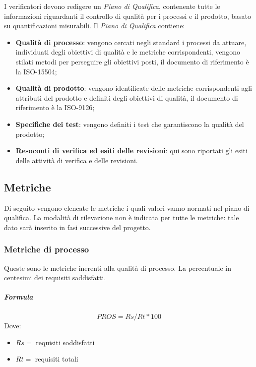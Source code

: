 			I verificatori devono redigere un \textit{Piano di Qualifica}, contenente tutte le informazioni riguardanti il controllo di qualità  per i processi e il prodotto, basato su quantificazioni misurabili. Il \textit{Piano di Qualifica} contiene:
			\begin{itemize}
			    \item \textbf{Qualità di processo}: vengono cercati negli standard i processi da attuare, individuati degli obiettivi di qualità e le metriche corrispondenti, vengono stilati metodi per perseguire gli obiettivi posti, il documento di riferimento è la ISO-15504;
			    \item \textbf{Qualità di prodotto}: vengono identificate delle metriche corrispondenti agli attributi del prodotto e definiti degli obiettivi di qualità, il documento di riferimento è la ISO-9126;
			    \item \textbf{Specifiche dei test}: vengono definiti i test che garantiscono la qualità del prodotto;
			    \item \textbf{Resoconti di verifica ed esiti delle revisioni}: qui sono riportati gli esiti delle attività di verifica e delle revisioni.
			\end{itemize}
			\subsection{Metriche}
			Di seguito vengono elencate le metriche i quali valori vanno normati nel piano di qualifica. 
        La modalità di rilevazione non è indicata per tutte le metriche: tale dato sarà 
        inserito in fasi successive del progetto.
        \subsubsection{Metriche di processo}
        Queste sono le metriche inerenti alla qualità di processo.
        La percentuale in centesimi dei requisiti saddisfatti.
        \subparagraph{Formula}
        \begin{displaymath}
         PROS = Rs / Rt *100
        \end{displaymath}
        Dove:
        \begin{itemize}
            \item[] $Rs =$ requisiti soddisfatti
            \item[] $Rt =$ requisiti totali
        \end{itemize}
        
